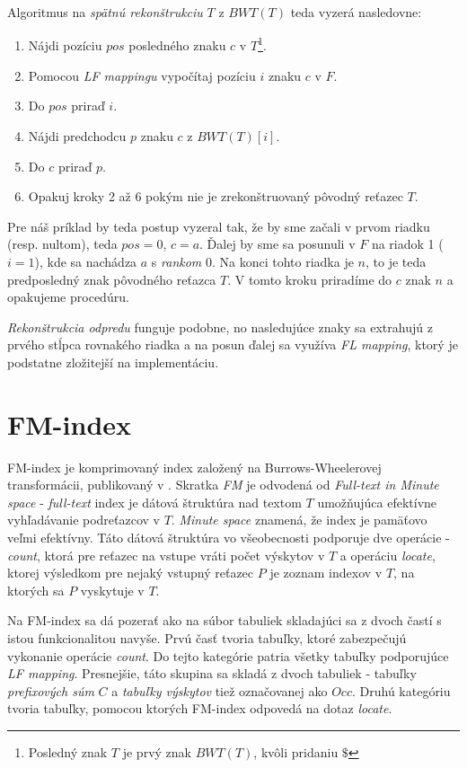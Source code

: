     Algoritmus na \emph{spätnú rekonštrukciu} $T$ z $BWT(T)$ teda vyzerá nasledovne:
    
    \begin{enumerate}
        \item{Nájdi pozíciu $pos$ posledného znaku $c$ v $T$\footnote{Posledný znak $T$ je prvý znak $BWT(T)$, kvôli pridaniu $\$$}.}
        \item{Pomocou \emph{LF mappingu} vypočítaj pozíciu $i$ znaku $c$ v $F$.}
        \item{Do $pos$ priraď $i$.}
        \item{Nájdi predchodcu $p$ znaku $c$ z $BWT(T)[i]$.}
        \item{Do $c$ priraď $p$.}
        \item{Opakuj kroky 2 až 6 pokým nie je zrekonštruovaný pôvodný reťazec $T$.}
    \end{enumerate}
    
    Pre náš príklad by teda postup vyzeral tak, že by sme začali v prvom riadku (resp. nultom), teda $pos = 0$, $c = a$. Ďalej by sme sa posunuli v $F$ na riadok 1 ($i = 1$), kde sa nachádza $a$ s \emph{rankom} 0. Na konci tohto riadka je $n$, to je teda predposledný znak pôvodného reťazca $T$. V tomto kroku priradíme do $c$ znak $n$ a opakujeme procedúru.
    
    \emph{Rekonštrukcia odpredu} funguje podobne, no nasledujúce znaky sa extrahujú z prvého stĺpca rovnakého riadka a na posun ďalej sa využíva \emph{FL mapping}, ktorý je podstatne zložitejší na implementáciu.
    
    
\section{FM-index}
\label{sec:fm_index}
    FM-index je komprimovaný index založený na Burrows-Wheelerovej transformácii, publikovaný v \cite{FM00}. Skratka \emph{FM} je odvodená od \emph{Full-text in Minute space} - \emph{full-text} index je dátová štruktúra nad textom $T$ umožňujúca efektívne vyhľadávanie podreťazcov v $T$. \emph{Minute space} znamená, že index je pamäťovo veľmi efektívny. Táto dátová štruktúra vo všeobecnosti podporuje dve operácie - \emph{count}, ktorá pre reťazec na vstupe vráti počet výskytov v $T$ a operáciu \emph{locate}, ktorej výsledkom pre nejaký vstupný reťazec $P$ je zoznam indexov v $T$, na ktorých sa $P$ vyskytuje v $T$.
    
    Na FM-index sa dá pozerať ako na súbor tabuliek skladajúci sa z dvoch častí s istou funkcionalitou navyše. Prvú časť tvoria tabuľky, ktoré zabezpečujú vykonanie operácie \emph{count}. Do tejto kategórie patria všetky tabuľky podporujúce \emph{LF mapping}. Presnejšie, táto skupina sa skladá z dvoch tabuliek - tabuľky \emph{prefixových súm} $C$ a \emph{tabuľky výskytov} tiež označovanej ako $Occ$. Druhú kategóriu tvoria tabuľky, pomocou ktorých FM-index odpovedá na dotaz \emph{locate}.
    
